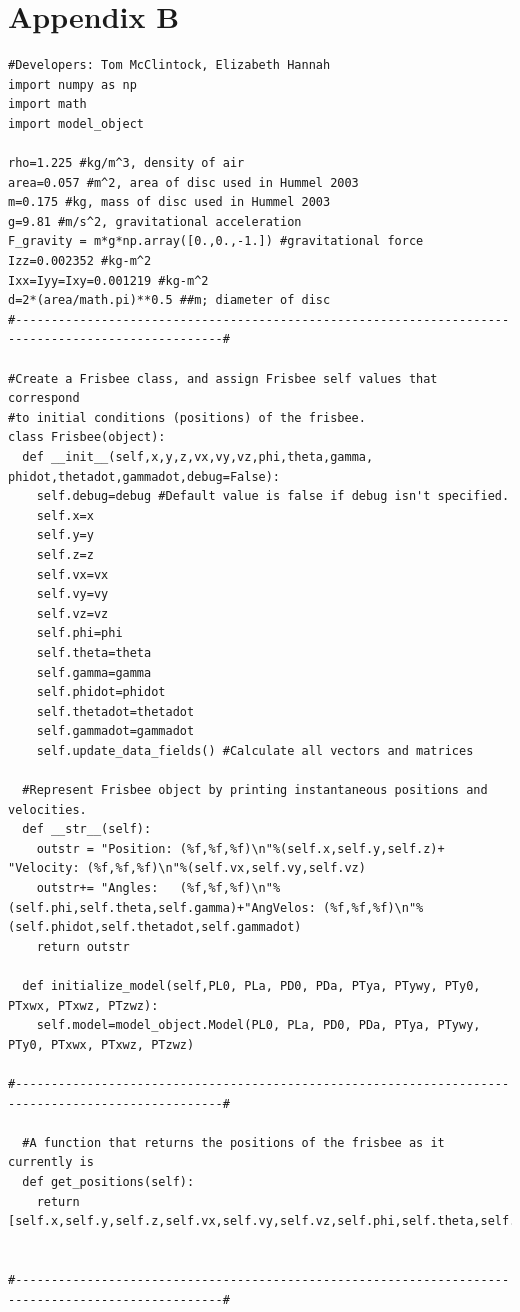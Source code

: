 \documentclass[a4paper,12pt, oneside]{article}
\begin{document}
\section*{Appendix B}
\begin{verbatim}
#Developers: Tom McClintock, Elizabeth Hannah
import numpy as np
import math
import model_object

rho=1.225 #kg/m^3, density of air
area=0.057 #m^2, area of disc used in Hummel 2003
m=0.175 #kg, mass of disc used in Hummel 2003
g=9.81 #m/s^2, gravitational acceleration
F_gravity = m*g*np.array([0.,0.,-1.]) #gravitational force
Izz=0.002352 #kg-m^2
Ixx=Iyy=Ixy=0.001219 #kg-m^2
d=2*(area/math.pi)**0.5 ##m; diameter of disc
#---------------------------------------------------------------------------------------------------#

#Create a Frisbee class, and assign Frisbee self values that correspond 
#to initial conditions (positions) of the frisbee.
class Frisbee(object):
  def __init__(self,x,y,z,vx,vy,vz,phi,theta,gamma, phidot,thetadot,gammadot,debug=False):
    self.debug=debug #Default value is false if debug isn't specified.
    self.x=x 
    self.y=y
    self.z=z
    self.vx=vx
    self.vy=vy
    self.vz=vz
    self.phi=phi
    self.theta=theta
    self.gamma=gamma
    self.phidot=phidot
    self.thetadot=thetadot
    self.gammadot=gammadot
    self.update_data_fields() #Calculate all vectors and matrices
    
  #Represent Frisbee object by printing instantaneous positions and velocities.
  def __str__(self):
    outstr = "Position: (%f,%f,%f)\n"%(self.x,self.y,self.z)+          "Velocity: (%f,%f,%f)\n"%(self.vx,self.vy,self.vz)
    outstr+= "Angles:   (%f,%f,%f)\n"%(self.phi,self.theta,self.gamma)+"AngVelos: (%f,%f,%f)\n"%(self.phidot,self.thetadot,self.gammadot)
    return outstr

  def initialize_model(self,PL0, PLa, PD0, PDa, PTya, PTywy, PTy0, PTxwx, PTxwz, PTzwz):
    self.model=model_object.Model(PL0, PLa, PD0, PDa, PTya, PTywy, PTy0, PTxwx, PTxwz, PTzwz)

#---------------------------------------------------------------------------------------------------#

  #A function that returns the positions of the frisbee as it currently is
  def get_positions(self):
    return [self.x,self.y,self.z,self.vx,self.vy,self.vz,self.phi,self.theta,self.gamma,self.phidot,self.thetadot,self.gammadot]


#---------------------------------------------------------------------------------------------------#


\end{verbatim}
\end{document}
